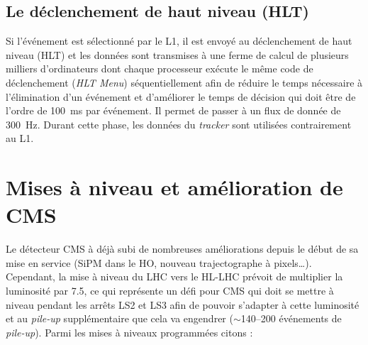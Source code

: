 \subsection{Le déclenchement de haut niveau (HLT)}
Si l'événement est sélectionné par le L1, il est envoyé au déclenchement de haut niveau (HLT) et les données sont transmises à une ferme de calcul de plusieurs milliers d'ordinateurs  dont chaque processeur exécute le même code de déclenchement (\textit{HLT Menu}) séquentiellement afin de réduire le temps nécessaire à l'élimination d'un événement et d'améliorer le temps de décision qui doit être de l'ordre de \SI{100}{\milli\second} par événement. Il permet de passer à un flux de donnée de \SI{300}{\hertz}. Durant cette phase, les données du \textit{tracker} sont utilisées contrairement au L1.

\section{Mises à niveau et amélioration de CMS}
Le détecteur CMS à déjà subi de nombreuses améliorations depuis le début de sa mise en service (SiPM dans le HO, nouveau trajectographe à pixels\ldots). Cependant, la mise à niveau du LHC vers le HL-LHC prévoit de multiplier la luminosité par \num{7.5}, ce qui représente un défi pour CMS qui doit se mettre à niveau pendant les arrêts LS2 et LS3 afin de pouvoir s'adapter à cette luminosité et au \textit{pile-up} supplémentaire que cela va engendrer ($\sim$\num{140}--\num{200} événements de \textit{pile-up}). Parmi les mises à niveaux programmées citons \cite{Collaboration:1355706} \cite{Contardo:2020886} :
